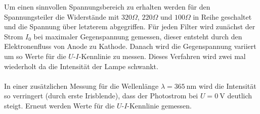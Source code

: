 Um einen sinnvollen Spannungsbereich zu erhalten werden für den Spannungsteiler die Widerstände mit $320\Omega$, $220\Omega$ und $100\Omega$ in Reihe geschaltet und die Spannung über letzterem abgegriffen. Für jeden Filter wird zunächst der Strom $I_0$ bei maximaler Gegenspannung gemessen, dieser entsteht durch den Elektronenfluss von Anode zu Kathode. Danach wird die Gegenspannung variiert um so Werte für die $U$-$I$-Kennlinie zu messen. Dieses Verfahren wird zwei mal wiederholt da die Intensität der Lampe schwankt. \\ \\

In einer zusätzlichen Messung für die Wellenlänge $\lambda=\si{365 \ \nano \metre}$ wird die Intensität so verringert (durch erste Irisblende), dass der Photostrom bei $U=\si{0 \ \volt}$ deutlich steigt. Erneut werden Werte für die $U$-$I$-Kennlinie gemessen.
